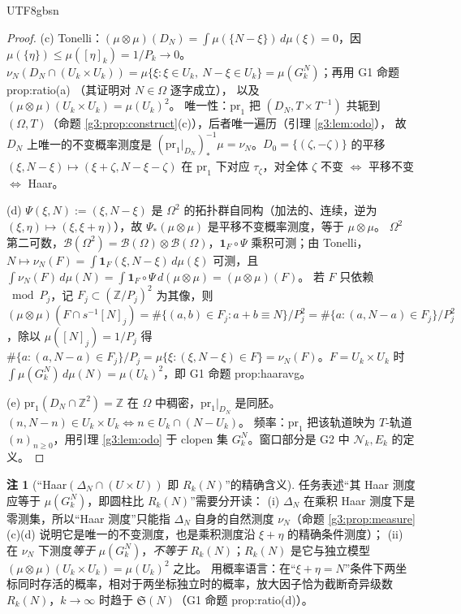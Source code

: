 \documentclass[11pt,a4paper]{article}
\newcommand{\Haar}{\mu}
\newcommand{\Sing}{\mathfrak S}
\newcommand{\Cnt}{\mathcal N}          %
\newcommand{\Om}{\Omega}               %
\newcommand{\cyl}[2]{[#1]_{#2}}        %
\newcommand{\pr}{\mathrm{pr}}
\theoremstyle{plain}
\theoremstyle{definition}
\newtheorem{rem}[lem]{注}
\begin{document}
\begin{CJK}{UTF8}{gbsn}
\begin{proof}
(c) Tonelli：$(\Haar\otimes\Haar)(D_N)=\int\Haar(\{N-\xi\})\,d\Haar(\xi)=0$，因 $\Haar(\{\eta\})\le\Haar(\cyl{\eta}k)=1/P_k\to0$。
$\nu_N(D_N\cap(U_k\times U_k))=\Haar\{\xi:\xi\in U_k,\ N-\xi\in U_k\}=\Haar(G_k^N)$；再用 G1 命题 prop:ratio(a) \cite{G1}（其证明对 $N\in\Om$ 逐字成立），
以及 $(\Haar\otimes\Haar)(U_k\times U_k)=\Haar(U_k)^2$。
唯一性：$\pr_1$ 把 $(D_N,T\times T^{-1})$ 共轭到 $(\Om,T)$（命题 \ref{g3:prop:construct}(c)），后者唯一遍历（引理 \ref{g3:lem:odo}），
故 $D_N$ 上唯一的不变概率测度是 $(\pr_1|_{D_N})^{-1}_*\Haar=\nu_N$。$D_0=\{(\zeta,-\zeta)\}$ 的平移 $(\xi,N-\xi)\mapsto(\xi+\zeta,N-\xi-\zeta)$
在 $\pr_1$ 下对应 $\tau_\zeta$，对全体 $\zeta$ 不变 $\iff$ 平移不变 $\iff$ Haar。

(d) $\Psi(\xi,N):=(\xi,N-\xi)$ 是 $\Om^2$ 的拓扑群自同构（加法的、连续，逆为 $(\xi,\eta)\mapsto(\xi,\xi+\eta)$），故 $\Psi_*(\Haar\otimes\Haar)$ 是平移不变概率测度，等于 $\Haar\otimes\Haar$。
$\Om^2$ 第二可数，$\mathcal B(\Om^2)=\mathcal B(\Om)\otimes\mathcal B(\Om)$，$\mathbf 1_F\circ\Psi$ 乘积可测；由 Tonelli，$N\mapsto\nu_N(F)=\int\mathbf 1_F(\xi,N-\xi)\,d\Haar(\xi)$ 可测，且
$\int\nu_N(F)\,d\Haar(N)=\int\mathbf 1_F\circ\Psi\,d(\Haar\otimes\Haar)=(\Haar\otimes\Haar)(F)$。
若 $F$ 只依赖 $\bmod P_j$，记 $F_j\subset(\mathbb Z/P_j)^2$ 为其像，则
$(\Haar\otimes\Haar)(F\cap s^{-1}\cyl Nj)=\#\{(a,b)\in F_j:a+b\equiv N\}/P_j^2=\#\{a:(a,N-a)\in F_j\}/P_j^2$，除以 $\Haar(\cyl Nj)=1/P_j$
得 $\#\{a:(a,N-a)\in F_j\}/P_j=\Haar\{\xi:(\xi,N-\xi)\in F\}=\nu_N(F)$。$F=U_k\times U_k$ 时 $\int\Haar(G_k^N)\,d\Haar(N)=\Haar(U_k)^2$，即 G1 命题 prop:haaravg。

(e) $\pr_1(D_N\cap\mathbb Z^2)=\mathbb Z$ 在 $\Om$ 中稠密，$\pr_1|_{D_N}$ 是同胚。$(n,N-n)\in U_k\times U_k\iff n\in U_k\cap(N-U_k)$。
频率：$\pr_1$ 把该轨道映为 $T$-轨道 $(n)_{n\ge0}$，用引理 \ref{g3:lem:odo} 于 clopen 集 $G_k^N$。窗口部分是 G2 中 $\Cnt_k,E_k$ 的定义。
\end{proof}

\begin{rem}[“Haar$(\Delta_N\cap(U\times U))$ 即 $R_k(N)$”的精确含义]\label{g3:rem:ratio}
任务表述“其 Haar 测度应等于 $\Haar(G_k^N)$，即圆柱比 $R_k(N)$”需要分开读：
(i) $\Delta_N$ 在乘积 Haar 测度下是零测集，所以“Haar 测度”只能指 $\Delta_N$ 自身的自然测度 $\nu_N$（命题 \ref{g3:prop:measure}(c)(d) 说明它是唯一的不变测度，也是乘积测度沿 $\xi+\eta$ 的精确条件测度）；
(ii) 在 $\nu_N$ 下测度\emph{等于} $\Haar(G_k^N)$，\emph{不等于} $R_k(N)$；$R_k(N)$ 是它与独立模型 $(\Haar\otimes\Haar)(U_k\times U_k)=\Haar(U_k)^2$ 之比。
用概率语言：在“$\xi+\eta=N$”条件下两坐标同时存活的概率，相对于两坐标独立时的概率，放大因子恰为截断奇异级数 $R_k(N)$，$k\to\infty$ 时趋于 $\Sing(N)$（G1 命题 prop:ratio(d)）。
\end{rem}


\end{CJK}
\end{document}
